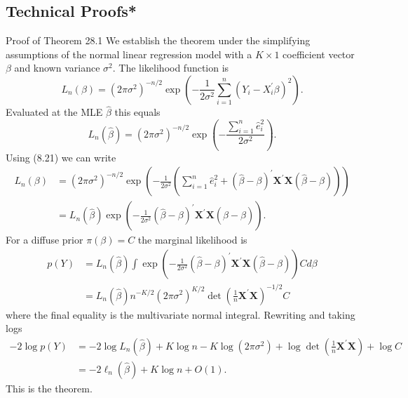 \documentclass[10pt]{article}
\begin{document}
\subsection{Technical Proofs*}
Proof of Theorem 28.1 We establish the theorem under the simplifying assumptions of the normal linear regression model with a $K \times 1$ coefficient vector $\beta$ and known variance $\sigma^{2}$. The likelihood function is
$$
L_{n}(\beta)=\left(2 \pi \sigma^{2}\right)^{-n / 2} \exp \left(-\frac{1}{2 \sigma^{2}} \sum_{i=1}^{n}\left(Y_{i}-X_{i}^{\prime} \beta\right)^{2}\right) .
$$
Evaluated at the MLE $\widehat{\beta}$ this equals
$$
L_{n}(\widehat{\beta})=\left(2 \pi \sigma^{2}\right)^{-n / 2} \exp \left(-\frac{\sum_{i=1}^{n} \widehat{e}_{i}^{2}}{2 \sigma^{2}}\right) .
$$
Using (8.21) we can write
$$
\begin{aligned}
L_{n}(\beta) &=\left(2 \pi \sigma^{2}\right)^{-n / 2} \exp \left(-\frac{1}{2 \sigma^{2}}\left(\sum_{i=1}^{n} \widehat{e}_{i}^{2}+(\widehat{\beta}-\beta)^{\prime} \boldsymbol{X}^{\prime} \boldsymbol{X}(\widehat{\beta}-\beta)\right)\right) \\
&=L_{n}(\widehat{\beta}) \exp \left(-\frac{1}{2 \sigma^{2}}(\widehat{\beta}-\beta)^{\prime} \boldsymbol{X}^{\prime} \boldsymbol{X}(\widehat{\beta}-\beta)\right) .
\end{aligned}
$$
For a diffuse prior $\pi(\beta)=C$ the marginal likelihood is
$$
\begin{aligned}
p(Y) &=L_{n}(\widehat{\beta}) \int \exp \left(-\frac{1}{2 \sigma^{2}}(\widehat{\beta}-\beta)^{\prime} \boldsymbol{X}^{\prime} \boldsymbol{X}(\widehat{\beta}-\beta)\right) C d \beta \\
&=L_{n}(\widehat{\beta}) n^{-K / 2}\left(2 \pi \sigma^{2}\right)^{K / 2} \operatorname{det}\left(\frac{1}{n} \boldsymbol{X}^{\prime} \boldsymbol{X}\right)^{-1 / 2} C
\end{aligned}
$$
where the final equality is the multivariate normal integral. Rewriting and taking logs
$$
\begin{aligned}
-2 \log p(Y) &=-2 \log L_{n}(\widehat{\beta})+K \log n-K \log \left(2 \pi \sigma^{2}\right)+\log \operatorname{det}\left(\frac{1}{n} \boldsymbol{X}^{\prime} \boldsymbol{X}\right)+\log C \\
&=-2 \ell_{n}(\widehat{\beta})+K \log n+O(1) .
\end{aligned}
$$
This is the theorem.
\end{document}
